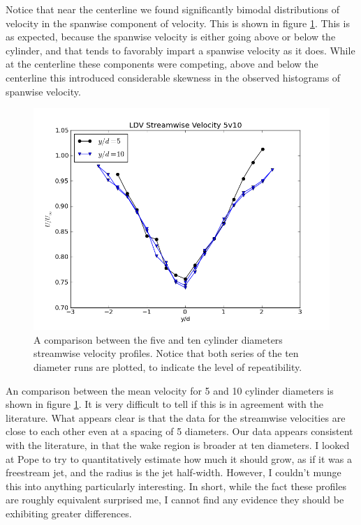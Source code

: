 \documentclass{article}
\begin{document}
Notice that near the centerline we found significantly bimodal
distributions of velocity in the spanwise component of velocity. This is
shown in figure \ref{back}. This is as expected, because the spanwise
velocity is either going above or below the cylinder, and that tends to
favorably impart a spanwise velocity as it does. While at the centerline
these components were competing, above and below the centerline this
introduced considerable skewness in the observed histograms of spanwise
velocity. 

\begin{figure}[!htb]
 \begin{center}
  \includegraphics[width = 12 cm]{figs/defect10}
  \caption{A comparison between the five and ten cylinder diameters
  streamwise velocity profiles. Notice that both series of the ten diameter runs are plotted, to 
indicate the level of repeatibility. }
  \label{back}
 \end{center}
\end{figure}

An comparison between the mean velocity for 5 and 10 cylinder diameters
is shown in figure \ref{back}. It is very difficult to tell if this
is in agreement with the literature. What appears clear is that the data
for the streamwise velocities are close to each other even at a spacing
of 5 diameters. Our data appears consistent with the literature, in that
the wake region is broader at ten diameters. I looked at Pope to try to
quantitatively estimate how much it should grow, as if it was a
freestream jet, and the radius is the jet half-width. However, I
couldn't munge this into anything particularly interesting. In short,
while the fact these profiles are roughly equivalent surprised me, I
cannot find any evidence they should be exhibiting greater differences. 
\end{document}
